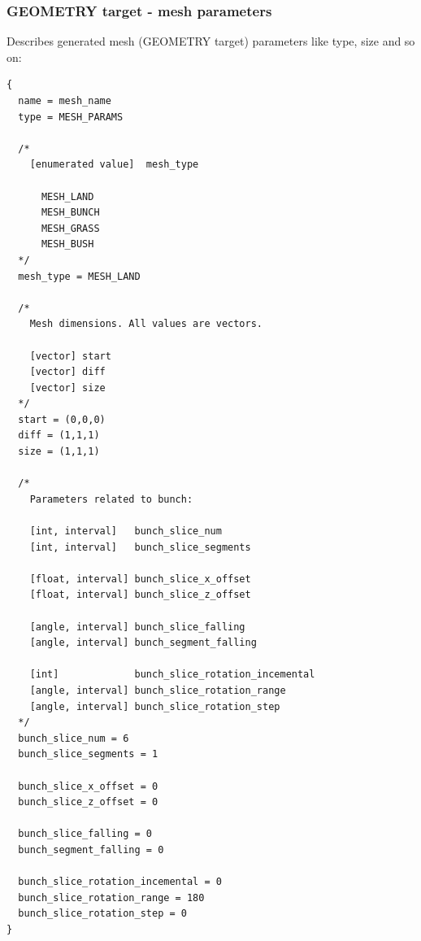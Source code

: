 \documentclass[9pt]{article}
\begin{document}
\subsubsection{GEOMETRY target - mesh parameters}
Describes generated mesh (GEOMETRY target) parameters like type, size and so on:
\begin{verbatim}
{
  name = mesh_name
  type = MESH_PARAMS

  /*
    [enumerated value]  mesh_type
   
      MESH_LAND
      MESH_BUNCH
      MESH_GRASS
      MESH_BUSH
  */
  mesh_type = MESH_LAND
  
  /*
    Mesh dimensions. All values are vectors.
  
    [vector] start
    [vector] diff
    [vector] size
  */  
  start = (0,0,0)
  diff = (1,1,1)
  size = (1,1,1)
  
  /*
    Parameters related to bunch:
    
    [int, interval]   bunch_slice_num
    [int, interval]   bunch_slice_segments
      
    [float, interval] bunch_slice_x_offset
    [float, interval] bunch_slice_z_offset
      
    [angle, interval] bunch_slice_falling
    [angle, interval] bunch_segment_falling
        
    [int]             bunch_slice_rotation_incemental
    [angle, interval] bunch_slice_rotation_range
    [angle, interval] bunch_slice_rotation_step
  */    
  bunch_slice_num = 6
  bunch_slice_segments = 1
  
  bunch_slice_x_offset = 0
  bunch_slice_z_offset = 0
  
  bunch_slice_falling = 0
  bunch_segment_falling = 0
  
  bunch_slice_rotation_incemental = 0
  bunch_slice_rotation_range = 180
  bunch_slice_rotation_step = 0
}
\end{verbatim}
\end{document}
